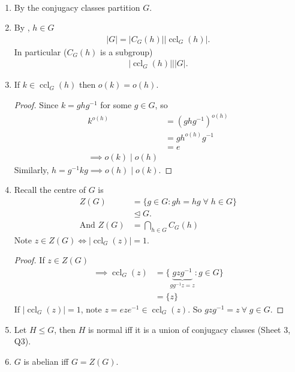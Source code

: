 \begin{remark} ~
    \begin{enumerate}
        \item By  the conjugacy classes partition $G$.
        \item By , $h \in G$
        \begin{align*}
            |G| = |C_G(h)| |\operatorname{ccl}_G(h)|.
        \end{align*} 
        In particular ($C_G(h)$ is a subgroup)
        \begin{align*}
            |\operatorname{ccl}_G(h)| \mathbin{\bigg|} |G|.
        \end{align*} 
        \item If $k \in \operatorname{ccl}_G(h)$ then $o(k) = o(h)$.
        \begin{proof}
            Since $k = ghg^{-1}$ for some $g \in G$, so
        \begin{align*}
            k^{o(h)} &= (ghg^{-1})^{o(h)} \\
            &= g h^{o(h)} g^{-1} \\
            &= e \\
            \implies o(k) \mid o(h)
        \end{align*} 
        Similarly, $h = g^{-1} k g \implies o(h) \mid o(k)$.
        \end{proof} 
        \item \label{conjugacy-4}
        Recall the centre of $G$ is
        \begin{align*}
            Z(G) &= \{g \in G : gh = hg \; \forall \; h \in G\} \\
            &\trianglelefteq G. \\
            \text{And } Z(G) &= \bigcap_{h \in G} C_G(h)
        \end{align*} 
        Note $z \in Z(G) \iff |\operatorname{ccl}_G(z)| = 1$.
        \begin{proof}
            If $z \in Z(G)$
            \begin{align*}
                \implies \operatorname{ccl}_G(z) &= \{ \underbrace{gzg^{-1}}_{gg^{-1} z = z} : g \in G\} \\
                &= \{z\}
            \end{align*} 
            If $|\operatorname{ccl}_G(z)| = 1$, note $z = e z e^{-1} \in \operatorname{ccl}_G(z)$.
            So $gzg^{-1} = z \ \forall \; g \in G$.
        \end{proof} 
        \item Let $H \leq G$, then $H$ is normal iff it is a union of conjugacy classes (Sheet 3, Q3).
        \item $G$ is abelian iff $G = Z(G)$.
    \end{enumerate} 
\end{remark} 

